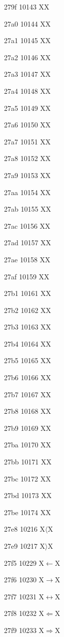 \documentclass[11pt]{article}
\begin{document}
279f 10143 X{}X

27a0 10144 X{}X

27a1 10145 X{}X

27a2 10146 X{}X

27a3 10147 X{}X

27a4 10148 X{}X

27a5 10149 X{}X

27a6 10150 X{}X

27a7 10151 X{}X

27a8 10152 X{}X

27a9 10153 X{}X

27aa 10154 X{}X

27ab 10155 X{}X

27ac 10156 X{}X

27ad 10157 X{}X

27ae 10158 X{}X

27af 10159 X{}X

27b1 10161 X{}X

27b2 10162 X{}X

27b3 10163 X{}X

27b4 10164 X{}X

27b5 10165 X{}X

27b6 10166 X{}X

27b7 10167 X{}X

27b8 10168 X{}X

27b9 10169 X{}X

27ba 10170 X{}X

27bb 10171 X{}X

27bc 10172 X{}X

27bd 10173 X{}X

27be 10174 X{}X

27e8 10216 X{\ensuremath{\langle}}X

27e9 10217 X{\ensuremath{\rangle}}X

27f5 10229 X{\ensuremath{\longleftarrow}}X

27f6 10230 X{\ensuremath{\longrightarrow}}X

27f7 10231 X{\ensuremath{\longleftrightarrow}}X

27f8 10232 X{\ensuremath{\Longleftarrow}}X

27f9 10233 X{\ensuremath{\Longrightarrow}}X
\end{document}
